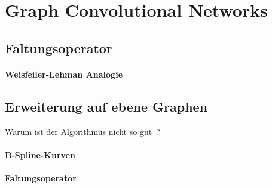 \section{Graph Convolutional Networks}
\label{graph_convolutional_networks}

\cite{gcn}

\subsection{Faltungsoperator}
\label{gcn_faltungsoperator}

\paragraph{Weisfeiler-Lehman Analogie}
\label{weisfeiler_lehman_analogie}

\subsection{Erweiterung auf ebene Graphen}
\label{gcn_erweiterung}

Warum ist der Algorithmus nicht so gut~\cite{gcn_review}?

\paragraph{B-Spline-Kurven}
\label{bspline}

\paragraph{Faltungsoperator}
\label{ebener_faltungsoperator}
